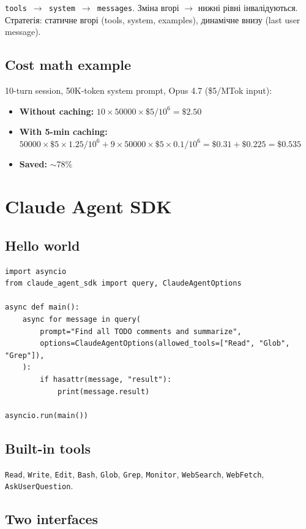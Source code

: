\documentclass[11pt,a4paper]{article}
\begin{document}
\texttt{tools $\to$ system $\to$ messages}. Зміна вгорі $\to$ нижні рівні інвалідуються. Стратегія: статичне вгорі (tools, system, examples), динамічне внизу (last user message).

\subsection{Cost math example}

10-turn session, 50K-token system prompt, Opus 4.7 (\$5/MTok input):

\begin{itemize}
\item \textbf{Without caching:} $10 \times 50000 \times \$5/10^6 = \$2.50$
\item \textbf{With 5-min caching:} $50000 \times \$5 \times 1.25 / 10^6 + 9 \times 50000 \times \$5 \times 0.1/10^6 = \$0.31 + \$0.225 = \$0.535$
\item \textbf{Saved:} $\sim$78\%
\end{itemize}

\section{Claude Agent SDK}

\subsection{Hello world}

\begin{lstlisting}[language=python2]
import asyncio
from claude_agent_sdk import query, ClaudeAgentOptions

async def main():
    async for message in query(
        prompt="Find all TODO comments and summarize",
        options=ClaudeAgentOptions(allowed_tools=["Read", "Glob", "Grep"]),
    ):
        if hasattr(message, "result"):
            print(message.result)

asyncio.run(main())
\end{lstlisting}

\subsection{Built-in tools}

\texttt{Read}, \texttt{Write}, \texttt{Edit}, \texttt{Bash}, \texttt{Glob}, \texttt{Grep}, \texttt{Monitor}, \texttt{WebSearch}, \texttt{WebFetch}, \texttt{AskUserQuestion}.

\subsection{Two interfaces}
\end{document}
